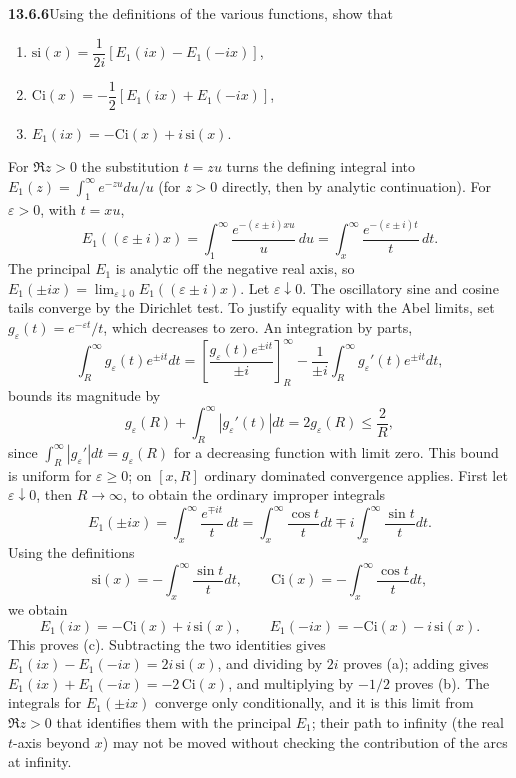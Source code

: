 \par\bigskip
\noindent\textbf{13.6.6}\quad Using the definitions of the various functions,
show that
\begin{enumerate}
\item[(a)] $\mathrm{si}(x)=\dfrac{1}{2i}\left[E_{1}(ix)-E_{1}(-ix)\right]$,
\item[(b)] $\mathrm{Ci}(x)=-\dfrac{1}{2}\left[E_{1}(ix)+E_{1}(-ix)\right]$,
\item[(c)] $E_{1}(ix)=-\mathrm{Ci}(x)+i\,\mathrm{si}(x)$.
\end{enumerate}
\par\smallskip
{}
\solution
{}
For $\Re z>0$ the substitution $t=zu$ turns the defining integral
into $E_1(z)=\int_1^\infty e^{-zu}du/u$ (for $z>0$ directly, then
by analytic continuation).  For $\varepsilon>0$, with $t=xu$,
\[
E_1((\varepsilon\pm i)x)
=\int_1^\infty\frac{e^{-(\varepsilon\pm i)xu}}u\,du
=\int_x^\infty\frac{e^{-(\varepsilon\pm i)t}}t\,dt.
\]
The principal $E_1$ is analytic off the negative real axis, so
$E_1(\pm ix)=\lim_{\varepsilon\downarrow0}E_1((\varepsilon\pm i)x)$.
Let $\varepsilon\downarrow0$.  The oscillatory sine and cosine
tails converge by the Dirichlet test. To justify equality with the
Abel limits, set $g_\varepsilon(t)=e^{-\varepsilon t}/t$, which
decreases to zero.  An integration by parts,
\[
\int_R^\infty g_\varepsilon(t)e^{\pm it}dt
=\left[\frac{g_\varepsilon(t)e^{\pm it}}{\pm i}\right]_R^\infty
-\frac1{\pm i}\int_R^\infty g_\varepsilon'(t)e^{\pm it}dt,
\]
bounds its magnitude by
\[
g_\varepsilon(R)+\int_R^\infty|g_\varepsilon'(t)|dt
=2g_\varepsilon(R)\le\frac2R,
\]
since $\int_R^\infty|g_\varepsilon'|dt=g_\varepsilon(R)$ for a
decreasing function with limit zero.
This bound is uniform for $\varepsilon\ge0$; on $[x,R]$ ordinary
dominated convergence applies. First let $\varepsilon\downarrow0$,
then $R\to\infty$, to obtain the ordinary improper integrals
\[
E_1(\pm ix)=\int_x^\infty\frac{e^{\mp it}}t\,dt
=\int_x^\infty\frac{\cos t}{t}dt\mp i\int_x^\infty\frac{\sin t}{t}dt.
\]
Using the definitions
\[
\mathrm{si}(x)=-\int_x^\infty\frac{\sin t}{t}dt,
\qquad\mathrm{Ci}(x)=-\int_x^\infty\frac{\cos t}{t}dt,
\]
we obtain
\[
\boxed{E_1(ix)=-\mathrm{Ci}(x)+i\,\mathrm{si}(x)},
\qquad E_1(-ix)=-\mathrm{Ci}(x)-i\,\mathrm{si}(x).
\]
This proves (c).  Subtracting the two identities gives
$E_1(ix)-E_1(-ix)=2i\,\mathrm{si}(x)$, and dividing by $2i$ proves
(a); adding gives $E_1(ix)+E_1(-ix)=-2\,\mathrm{Ci}(x)$, and
multiplying by $-1/2$ proves (b).
The integrals for $E_1(\pm ix)$ converge only conditionally, and
it is this limit from $\Re z>0$ that identifies them with the
principal $E_1$; their path to infinity (the real $t$-axis beyond
$x$) may not be moved without checking the contribution of the
arcs at infinity.


